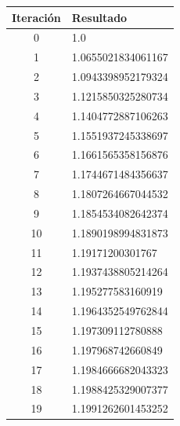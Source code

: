 \documentclass[titlepage,a4paper]{article}
\begin{document}
\begin{multicols}{2}
    \begin{center}
        \begin{tabular}{| c | l |}
        \hline
         Iteración & Resultado \\ \hline
        0     &  1.0 \\
        1     &  1.0655021834061167 \\
        2     &  1.0943398952179324 \\
        3     &  1.1215850325280734 \\
        4     &  1.1404772887106263 \\
        5     &  1.1551937245338697 \\
        6     &  1.1661565358156876 \\
        7     &  1.1744671484356637 \\
        8     &  1.1807264667044532 \\
        9     &  1.1854534082642374 \\
        10     &  1.1890198994831873 \\
        11     &  1.19171200301767 \\
        12     &  1.1937438805214264 \\
        13     &  1.195277583160919 \\
        14     &  1.1964352549762844 \\
        15     &  1.197309112780888 \\
        16     &  1.197968742660849 \\
        17     &  1.1984666682043323 \\
        18     &  1.1988425329007377 \\
        19     &  1.1991262601453252 \\


\end{tabular}
\end{center}
\end{multicols}
\end{document}
